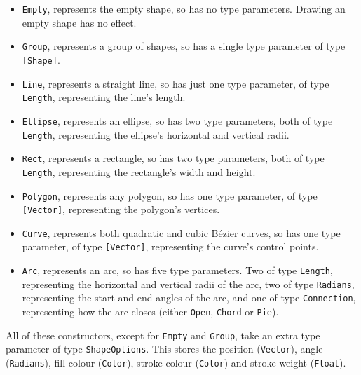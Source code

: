 \documentclass[../main.tex]{subfiles}
\begin{document}
                \begin{itemize}
                    \item \texttt{Empty}, represents the empty shape, so has no type parameters.
                          Drawing an empty shape has no effect.
                    \item \texttt{Group}, represents a group of shapes, so has a single type
                          parameter of type \texttt{[Shape]}.
                    \item \texttt{Line}, represents a straight line, so has just one type
                          parameter, of type \texttt{Length}, representing the line's length.
                    \item \texttt{Ellipse}, represents an ellipse, so has two type parameters, both of
                          type \texttt{Length}, representing the ellipse's horizontal and vertical radii.
                    \item \texttt{Rect}, represents a rectangle, so has two type parameters, both of type
                          \texttt{Length}, representing the rectangle's width and height.
                    \item \texttt{Polygon}, represents any polygon, so has one type parameter, of type
                          \texttt{[Vector]}, representing the polygon's vertices.
                    \item \texttt{Curve}, represents both quadratic and cubic Bézier curves, so has
                          one type parameter, of type \texttt{[Vector]}, representing the curve's control
                          points.
                    \item \texttt{Arc}, represents an arc, so has five type parameters.
                          Two of type \texttt{Length}, representing the horizontal and vertical radii of
                              the arc, two of type \texttt{Radians}, representing the start and end angles of
                              the arc, and one of type \texttt{Connection}, representing how the arc closes
                              (either \texttt{Open}, \texttt{Chord} or \texttt{Pie}).
                \end{itemize}

                All of these constructors, except for \texttt{Empty} and \texttt{Group}, take
                    an extra type parameter of type \texttt{ShapeOptions}.
                This stores the position (\texttt{Vector}), angle (\texttt{Radians}), fill
                    colour (\texttt{Color}), stroke colour (\texttt{Color}) and stroke weight
                    (\texttt{Float}).
\end{document}
